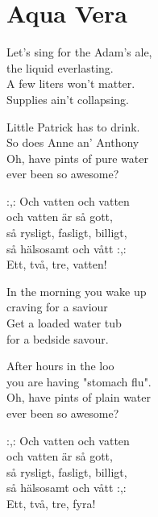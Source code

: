 \section{Aqua Vera}
Let's sing for the Adam's ale,\\
the liquid everlasting.\\
A few liters won't matter.\\
Supplies ain't collapsing.

Little Patrick has to drink.\\
So does Anne an' Anthony\\
Oh, have pints of pure water\\
ever been so awesome?

:,: Och vatten och vatten\\
och vatten är så gott,\\
så rysligt, fasligt, billigt,\\
så hälsosamt och vått :,:\\
Ett, två, tre, vatten!

In the morning you wake up\\
craving for a saviour\\
Get a loaded water tub\\
for a bedside savour.

After hours in the loo\\
you are having "stomach flu".\\
Oh, have pints of plain water\\
ever been so awesome?

:,: Och vatten och vatten\\
och vatten är så gott,\\
så rysligt, fasligt, billigt,\\
så hälsosamt och vått :,:\\
Ett, två, tre, fyra!